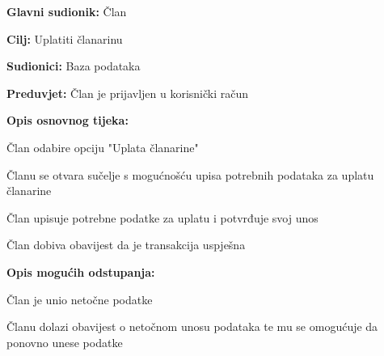 					\noindent {}
				\begin{packed_item}
					
					\item \textbf{Glavni sudionik: }Član
					\item  \textbf{Cilj: } Uplatiti članarinu
					\item  \textbf{Sudionici: } Baza podataka
					\item  \textbf{Preduvjet: } Član je prijavljen u korisnički račun
					\item  \textbf{Opis osnovnog tijeka:}
					
					\item[] \begin{packed_enum}
						
						\item Član odabire opciju "Uplata članarine"
						\item Članu se otvara sučelje s mogućnošću upisa potrebnih podataka za uplatu članarine  
						\item Član upisuje potrebne podatke za uplatu i potvrđuje svoj unos
						\item Član dobiva obavijest da je transakcija uspješna
						
					\end{packed_enum}
					
					\item  \textbf{Opis mogućih odstupanja:}
					
					\item[] \begin{packed_item}
						
					\item[3.a] Član je unio netočne podatke
					\item[] \begin{packed_enum}
						
						\item Članu dolazi obavijest o netočnom unosu podataka te mu se omogućuje da ponovno unese podatke
						
					\end{packed_enum}
						
					\end{packed_item}
				\end{packed_item}
			
